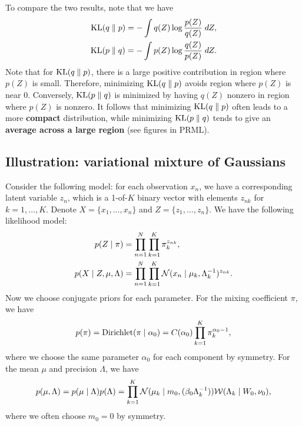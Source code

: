 \documentclass[a4paper]{article}
\begin{document}
To compare the two results, note that we have 
\[
\begin{aligned}
\mathrm{KL}(q \; \Vert \; p) = - \int q(Z) \log \frac{p(Z)}{q(Z)} \; d Z, \\
\mathrm{KL}(p \; \Vert \; q) = - \int p(Z) \log \frac{q(Z)}{p(Z)} \; d Z.
\end{aligned}
\]
Note that for $\mathrm{KL}(q \; \Vert \; p)$, there is a large positive 
contribution in region where $p(Z)$ is small.
Therefore, minimizing $\mathrm{KL}(q \; \Vert \; p)$ avoids region 
where $p(Z)$ is near $0$. Conversely, 
$\mathrm{KL}(p \; \Vert \; q)$ is minimized by having $q(Z)$ nonzero 
in region where $p(Z)$ is nonzero. It follows that 
minimizing $\mathrm{KL}(q \; \Vert \; p)$ often leads to a more \textbf{compact} 
distribution, while minimizing $\mathrm{KL}(p \; \Vert \; q)$ tends 
to give an \textbf{average across a large region}
(see figures in PRML).

\subsection{Illustration: variational mixture of
Gaussians}

Consider the following model: for each observation
$x_n$, we have a corresponding latent variable
$z_n$, which is a 1-of-$K$ binary vector with elements 
$z_{nk}$ for $k = 1, \dots, K$. Denote $X = \{x_1, \dots, 
x_n\}$ and $Z = \{z_1, \dots, z_n\}$. We have the 
following likelihood model:
\[
\begin{aligned}
p(Z \mid \pi) &= \prod_{n=1}^N \prod_{k=1}^K \pi_k^{z_{nk}}, \\
p(X \mid Z, \mu, \Lambda)
&= \prod_{n=1}^N \prod_{k=1}^K \mathcal{N}(x_n \mid \mu_k, \Lambda_k^{-1})
^{z_{nk}}.
\end{aligned}
\]
Now we choose conjugate priors for each parameter. For 
the mixing coefficient $\pi$, we have
\[
\begin{aligned}
p(\pi) = \operatorname{Dirichlet}(\pi \mid \alpha_0)
= C(\alpha_0) \prod_{k=1}^K \pi_k^{\alpha_0 - 1},
\end{aligned}
\]
where we choose the same parameter $\alpha_0$ for each 
component by symmetry. For the mean $\mu$ and precision
$\Lambda$, we have
\[
\begin{aligned}
p(\mu, \Lambda) 
= p(\mu \mid \Lambda) p(\Lambda) 
= \prod_{k=1}^K \mathcal{N} (\mu_k \mid m_0, (\beta_0 \Lambda_k^{-1}))
\mathcal{W} (\Lambda_k \mid W_0, \nu_0),
\end{aligned}
\]
where we often choose $m_0 = 0$ by symmetry.

\end{document}
